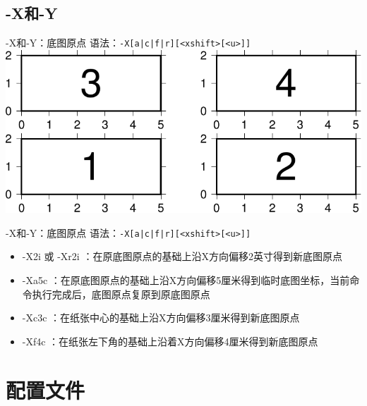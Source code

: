 \documentclass[UTF8, 11pt]{ctexbeamer}
\begin{document}
\subsection{-X和-Y}
\begin{frame}[fragile]{-X和-Y：底图原点}
语法：\verb!-X[a|c|f|r][<xshift>[<u>]]!
\includegraphics[width=\textwidth]{GMT_-XY}
\end{frame}
\begin{frame}[fragile]{-X和-Y：底图原点}
语法：\verb!-X[a|c|f|r][<xshift>[<u>]]!
\begin{itemize}
\item -X2i 或 -Xr2i ：在原底图原点的基础上沿X方向偏移2英寸得到新底图原点
\item -Xa5c ：在原底图原点的基础上沿X方向偏移5厘米得到临时底图坐标，当前命令执行完成后，底图原点复原到原底图原点
\item -Xc3c ：在纸张中心的基础上沿X方向偏移3厘米得到新底图原点
\item -Xf4c ：在纸张左下角的基础上沿着X方向偏移4厘米得到新底图原点
\end{itemize}
\end{frame}

\section{配置文件}
\end{document}
